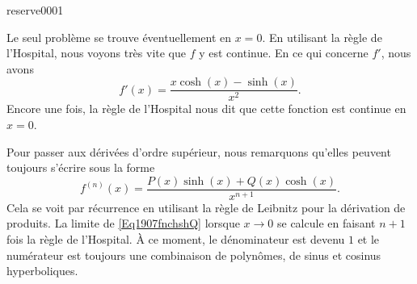 

\begin{corrige}{reserve0001}

	Le seul problème se trouve éventuellement en $x=0$. En utilisant la règle de l'Hospital, nous voyons très vite que $f$ y est continue. En ce qui concerne $f'$, nous avons
	\begin{equation}
		f'(x)=\frac{ x\cosh(x)-\sinh(x) }{ x^2 }.
	\end{equation}
	Encore une fois, la règle de l'Hospital nous dit que cette fonction est continue en $x=0$.

	Pour passer aux dérivées d'ordre supérieur, nous remarquons qu'elles peuvent toujours s'écrire sous la forme
	\begin{equation}	\label{Eq1907fnchshQ}
		f^{(n)}(x)=\frac{ P(x)\sinh(x)+Q(x)\cosh(x) }{ x^{n+1} }.
	\end{equation}
	Cela se voit par récurrence en utilisant la règle de Leibnitz pour la dérivation de produits. La limite de \eqref{Eq1907fnchshQ} lorsque $x\to 0$ se calcule en faisant $n+1$ fois la règle de l'Hospital. À ce moment, le dénominateur est devenu $1$ et le numérateur est toujours une combinaison de polynômes, de sinus et cosinus hyperboliques.

\end{corrige}
